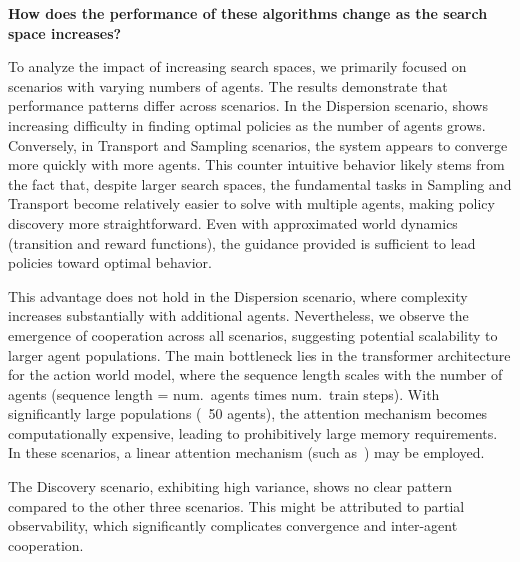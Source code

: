 \begin{center}
 \textbf{How does the performance of these algorithms change as the search space increases?}
\end{center}
To analyze the impact of increasing search spaces, we primarily focused on scenarios with varying numbers of agents. The results demonstrate that performance patterns differ across scenarios. In the Dispersion scenario, \fname{} shows increasing difficulty in finding optimal policies as the number of agents grows. Conversely, in Transport and Sampling scenarios, the system appears to converge more quickly with more agents. This counter intuitive behavior likely stems from the fact that, despite larger search spaces, the fundamental tasks in Sampling and Transport become relatively easier to solve with multiple agents, making policy discovery more straightforward. Even with approximated world dynamics (transition and reward functions), the guidance provided is sufficient to lead policies toward optimal behavior.

This advantage does not hold in the Dispersion scenario, where complexity increases substantially with additional agents. Nevertheless, we observe the emergence of cooperation across all scenarios, suggesting potential scalability to larger agent populations. The main bottleneck lies in the transformer architecture for the action world model, where the sequence length scales with the number of agents (sequence length = num.\ agents times num.\ train steps). With significantly large populations (~50 agents), the attention mechanism becomes computationally expensive, leading to prohibitively large memory requirements. In these scenarios, a linear attention mechanism (such as~\cite{Beltagy20}) may be employed.

The Discovery scenario, exhibiting high variance, shows no clear pattern compared to the other three scenarios.
This might be attributed to partial observability, which significantly complicates convergence and inter-agent cooperation.
